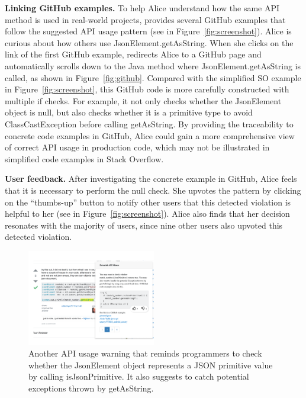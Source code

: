 {\bf Linking GitHub examples.} To help Alice understand how the same API method is used in real-world projects, {\tool} provides several GitHub examples that follow the suggested API usage pattern (see  in Figure~\ref{fig:screenshot}). Alice is curious about how others use {\ttt JsonElement.getAsString}. When she clicks on the link of the first GitHub example, {\tool} redirects Alice to a GitHub page and automatically scrolls down to the Java method where {\ttt JsonElement.getAsString} is called, as shown in Figure~\ref{fig:github}. Compared with the simplified SO example in Figure~\ref{fig:screenshot}, this GitHub code is more carefully constructed with multiple {\ttt if} checks. For example, it not only checks whether the {\ttt JsonElement} object is {\ttt null}, but also checks whether it is a primitive type to avoid {\ttt ClassCastException} before calling {\ttt getAsString}. By providing the traceability to concrete code examples in GitHub, Alice could gain a more comprehensive view of correct API usage in production code, which may not be illustrated in simplified code examples in Stack Overflow. 

{\bf User feedback.} After investigating the concrete example in GitHub, Alice feels that it is necessary to perform the {\ttt null} check. She upvotes the pattern by clicking on the ``thumbs-up'' button to notify other users that this detected violation is helpful to her (see  in Figure~\ref{fig:screenshot}). Alice also finds that her decision resonates with the majority of {\tool} users, since nine other users also upvoted this detected violation.

\begin{figure}
\centering
\includegraphics[width=0.5\textwidth]{examplecheck-page2.pdf}
  \caption{Another API usage warning that reminds programmers to check whether the {\ttt JsonElement} object represents a {\ttt JSON} primitive value by calling {\ttt isJsonPrimitive}. It also suggests to catch potential exceptions thrown by {\ttt getAsString}.}
  \label{fig:screenshot2}
\end{figure}

